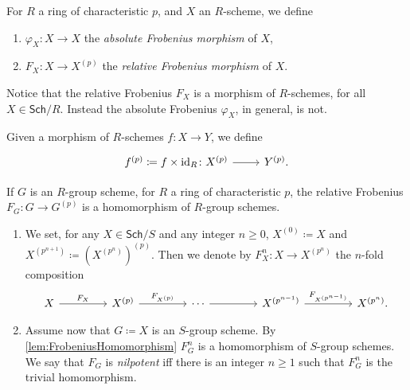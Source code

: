 \begin{defn}
	For $R$ a ring of characteristic $p$, and $X$ an $R$-scheme, we define
\begin{enumerate}
	\item $\varphi_X\colon X \to X$ the \emph{absolute Frobenius morphism} of $X$,
	\item $F_X \colon X \to X^{(p)}$ the \emph{relative Frobenius morphism} of $X$.
\end{enumerate}
\end{defn}


\begin{rem}[]
	Notice that the relative Frobenius $F_X$ is a
	morphism of $R$-schemes, for all $X \in \mathsf{Sch}/R$.
	Instead the absolute Frobenius $\varphi_X$, in general, is not.
\end{rem}


\begin{ntt}
	Given a morphism of $R$-schemes $f\colon X \to Y$,
	we define 
	\begin{equation*}
	\begin{tikzcd}[row sep = 0ex
		,/tikz/column 1/.append style={anchor=base east}
		,/tikz/column 2/.append style={anchor=base west}]
		f^{(p)} \coloneqq f \times \id_{ R }\colon 
		X^{(p)} \arrow[r, "", rightarrow] &
		Y^{(p)}
	.\end{tikzcd}
	\end{equation*}
\end{ntt}


\begin{lem}\label{lem:FrobeniusHomomorphism}
	If $G$ is an $R$-group scheme, for $R$ a ring of characteristic $p$,
	the relative Frobenius $F_G\colon G \to G^{(p)}$ is a 
	homomorphism of $R$-group schemes.
\end{lem} 


\begin{defn}\leavevmode\vspace{-1.2\baselineskip}\label{defn:nilpotentFrobenius}
\begin{enumerate}
\item We set, for any $X \in \mathsf{Sch}/S$ and any integer $n \geq 0$,
	$X^{(0)} \coloneqq X$ and $X^{(p^{n+1})} \coloneqq \left( X^{(p^{n})} \right)^{(p)}$.
	Then we denote by $F^n_X\colon X \to X^{(p^n)}$
	the $n$-fold composition
	\begin{equation*}
	\begin{tikzcd}[column sep=4.3em]
		X \arrow[r, "F_X", rightarrow] &
		X^{(p)} \arrow[r, "F_{X^{(p)}}", rightarrow] &
		\cdots \arrow[r, "", rightarrow] &
		X^{(p^{n-1})} \arrow[r, "F_{X^{(p^{n-1})}}", rightarrow] &
		X^{(p^n)}
	.\end{tikzcd}
	\end{equation*}
\item Assume now that $G \coloneqq X$ is an $S$-group scheme. 
	By \cref{lem:FrobeniusHomomorphism} $F^n_G$ is a homomorphism of \(S\)-group schemes.
	We say that $F_G$ is \emph{nilpotent} iff there is an integer $n \geq 1$ such that
	$F^n_G$ is the trivial homomorphism.
\end{enumerate}
\end{defn}


